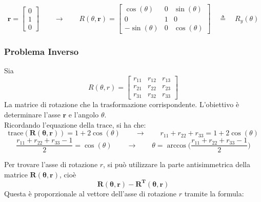 ﻿\documentclass[11pt, a4paper]{article}
\begin{document}
\[
\mathbf{r} =
\begin{bmatrix}
0 \\
1 \\
0
\end{bmatrix}
\qquad\longrightarrow\qquad
R(\theta, \mathbf{r}) =
\begin{bmatrix}
    \cos(\theta) & 0 & \sin(\theta) \\
    0 & 1 & 0 \\
    -\sin(\theta) & 0 & \cos(\theta)
\end{bmatrix}
\quad \triangleq \quad R_y(\theta)
\]

\newpage
\subsubsection{Problema Inverso}
Sia
\[
    R(\theta, r) =
    \begin{bmatrix}
        r_{11} & r_{12} & r_{13} \\
        r_{21} & r_{22} & r_{23} \\
        r_{31} & r_{32} & r_{33}
    \end{bmatrix}
\]
La matrice di rotazione che la trasformazione corrispondente. L'obiettivo è determinare l'asse $\mathbf{r}$ e l'angolo $\theta$.\\
Ricordando l'equazione della \(\text{trace}\), si ha che:
\[
    \text{trace}(\mathbf{\mathbf{R}(\theta, \mathbf{r})}) = 1 + 2\cos(\theta)
    \qquad\longrightarrow\qquad
    r_{11} + r_{22} + r_{33} = 1 + 2\cos(\theta)
\]
\[
    \frac{r_{11} + r_{22} + r_{33} - 1}{2} = \cos(\theta)
    \qquad\longrightarrow\qquad
    \theta = \arccos\biggl( \frac{r_{11} + r_{22} + r_{33} - 1}{2} \biggr)
\]

Per trovare l'asse di rotazione \( r \), si può utilizzare la parte antisimmetrica della matrice \( \mathbf{\mathbf{R}(\theta, \mathbf{r})} \), cioè
\[
    \mathbf{\mathbf{R}(\theta, \mathbf{r})} - \mathbf{\mathbf{R}^{T}(\theta, \mathbf{r})}
\]
Questa è proporzionale al vettore dell'asse di rotazione \( r \) tramite la formula:
\end{document}
